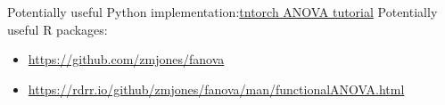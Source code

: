 Potentially useful Python implementation:\href{https://tntorch.readthedocs.io/en/latest/tutorials/anova.html}{tntorch ANOVA tutorial}
Potentially useful R packages:
\begin{itemize}
    \item \href{https://github.com/zmjones/fanova}{https://github.com/zmjones/fanova}
    \item \href{https://rdrr.io/github/zmjones/fanova/man/functionalANOVA.html}{https://rdrr.io/github/zmjones/fanova/man/functionalANOVA.html}
\end{itemize}

